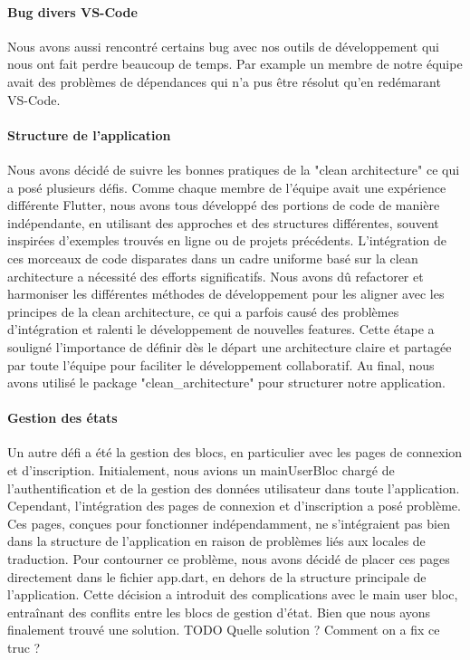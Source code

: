 \paragraph{Bug divers VS-Code} Nous avons aussi rencontré certains bug avec nos outils de développement qui nous ont fait perdre beaucoup de temps. Par example un membre de notre équipe avait des problèmes de dépendances qui n'a pus être résolut qu'en redémarant VS-Code.

\paragraph{Structure de l'application} Nous avons décidé de suivre les bonnes pratiques de la "clean architecture" ce qui a posé plusieurs défis. Comme chaque membre de l'équipe avait une expérience différente Flutter, nous avons tous développé des portions de code de manière indépendante, en utilisant des approches et des structures différentes, souvent inspirées d'exemples trouvés en ligne ou de projets précédents. L'intégration de ces morceaux de code disparates dans un cadre uniforme basé sur la clean architecture a nécessité des efforts significatifs. Nous avons dû refactorer et harmoniser les différentes méthodes de développement pour les aligner avec les principes de la clean architecture, ce qui a parfois causé des problèmes d'intégration et ralenti le développement de nouvelles features. Cette étape a souligné l'importance de définir dès le départ une architecture claire et partagée par toute l'équipe pour faciliter le développement collaboratif. Au final, nous avons utilisé le package "clean\_architecture" pour structurer notre application.

\paragraph{Gestion des états} Un autre défi a été la gestion des blocs, en particulier avec les pages de connexion et d'inscription. Initialement, nous avions un mainUserBloc chargé de l'authentification et de la gestion des données utilisateur dans toute l'application. Cependant, l'intégration des pages de connexion et d'inscription a posé problème. Ces pages, conçues pour fonctionner indépendamment, ne s'intégraient pas bien dans la structure de l'application en raison de problèmes liés aux locales de traduction. Pour contourner ce problème, nous avons décidé de placer ces pages directement dans le fichier app.dart, en dehors de la structure principale de l'application. Cette décision a introduit des complications avec le main user bloc, entraînant des conflits entre les blocs de gestion d'état. Bien que nous ayons finalement trouvé une solution. TODO Quelle solution ? Comment on a fix ce truc ?

